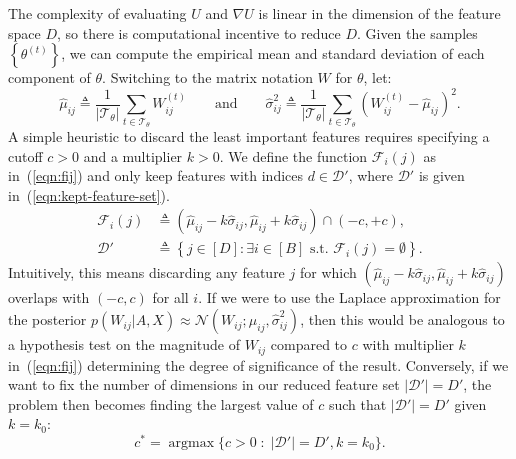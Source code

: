 The complexity of evaluating $U$ and $\nabla U$ is linear in 
the dimension of the feature space $D$,
so there is computational incentive to reduce $D$.
Given the samples $\left\{ \theta^{(t)} \right\}$, we can compute the empirical mean and standard deviation of each component of $\theta$. 
Switching to the matrix notation $W$ for $\theta$,
let:
%
\begin{equation}
	\hat{\mu}_{ij} \triangleq \frac{1}{|\mathcal{T}_\theta|} \sum_{t \in \mathcal{T}_\theta} W_{ij}^{(t)} \qquad \textrm{and} \qquad
	\hat{\sigma}_{ij}^2 \triangleq \frac{1}{|\mathcal{T}_\theta|} \sum_{t \in \mathcal{T}_\theta} \left( W_{ij}^{(t)} - \hat{\mu}_{ij} \right)^2.
\end{equation}
%
A simple heuristic to discard the least important features requires specifying a cutoff $c > 0$ and a multiplier $k > 0$. We define the function $\mathcal{F}_i(j)$ 
as in~(\ref{eqn:fij}) and only keep features with indices $d \in \mathcal{D}'$, where $\mathcal{D}'$ is given in~(\ref{eqn:kept-feature-set}).
%
\begin{align}
	\mathcal{F}_i(j) &\triangleq (\hat{\mu}_{ij} - k \hat{\sigma}_{ij}, \hat{\mu}_{ij} + k \hat{\sigma}_{ij}) \cap (-c, +c),
	\label{eqn:fij} \\
	\mathcal{D}' &\triangleq \left\{ j \in [D] : \exists i \in [B] \textrm{ s.t. }  \mathcal{F}_i(j) = \emptyset \right\}.
	\label{eqn:kept-feature-set}
\end{align}
%
Intuitively, this means discarding any feature $j$ for which 
$(\hat{\mu}_{ij} - k\hat{\sigma}_{ij}, \hat{\mu}_{ij} + k \hat{\sigma}_{ij})$ overlaps with
$(-c, c)$ for all $i$. If we were to use the Laplace approximation for the posterior $p(W_{ij} | A, X) \approx \mathcal{N}(W_{ij}; \hat{\mu}_{ij}, \hat{\sigma}_{ij}^2)$, then this would be analogous to a hypothesis test on the magnitude of $W_{ij}$ compared to $c$ with multiplier $k$ in~(\ref{eqn:fij}) determining the degree of significance of the result. Conversely, if we want to fix the number of dimensions in our reduced feature set $|\mathcal{D}'|=D'$, the problem then becomes finding the largest value of $c$ such that $|\mathcal{D}'|=D'$ given $k=k_0$:
%
\begin{equation}
	c^* = {\operatorname{argmax}} \{c>0\; : \;|\mathcal{D}'| = D', k=k_0\}.
	\label{eqn:c-star}
\end{equation}

